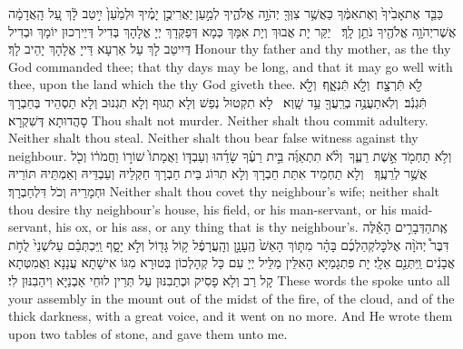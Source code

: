 {כַּבֵּ֤ד אֶת\maqqaf אָבִ֙יךָ֙ וְאֶת\maqqaf אִמֶּ֔ךָ כַּאֲשֶׁ֥ר צִוְּךָ֖ יְהֹוָ֣ה אֱלֹהֶ֑יךָ לְמַ֣עַן \legarmeh  יַאֲרִיכֻ֣ן יָמֶ֗יךָ וּלְמַ֙עַן֙ יִ֣יטַב לָ֔ךְ עַ֚ל הָֽאֲדָמָ֔ה אֲשֶׁר\maqqaf יְהֹוָ֥ה אֱלֹהֶ֖יךָ נֹתֵ֥ן לָֽךְ׃ \setuma }
{יַקַּר יָת אֲבוּךְ וְיָת אִמָּךְ כְּמָא דְּפַקְּדָךְ יְיָ אֱלָהָךְ בְּדִיל דְּיֵירְכוּן יוֹמָךְ וּבְדִיל דְּיִיטַב לָךְ עַל אַרְעָא דַּייָ אֱלָהָךְ יָהֵיב לָךְ׃}
{Honour thy father and thy mother, as the \lord\space thy God commanded thee; that thy days may be long, and that it may go well with thee, upon the land which the \lord\space thy God giveth thee.}{}
{לֹ֥֖א תִּֿרְצָ֖͏ֽח׃ \setuma  וְלֹ֣֖א תִּֿנְאָ֑͏ֽף׃ \setuma  וְלֹ֣֖א תִּֿגְנֹֽ֔ב׃ \setuma  וְלֹֽא\maqqaf תַעֲנֶ֥ה בְרֵֽעֲךָ֖ עֵ֥ד שָֽׁוְא׃ \setuma }
{לָא תִקְטוּל נְפַשׁ וְלָא תְגוּף וְלָא תִגְנוּב וְלָא תַסְהֵיד בְּחַבְרָךְ סָהֲדוּתָא דְּשִׁקְרָא׃}
{Thou shalt not murder. Neither shalt thou commit adultery. Neither shalt thou steal. Neither shalt thou bear false witness against thy neighbour.}{}
{וְלֹ֥א תַחְמֹ֖ד אֵ֣שֶׁת רֵעֶ֑ךָ \setuma  וְלֹ֨א תִתְאַוֶּ֜ה בֵּ֣ית רֵעֶ֗ךָ שָׂדֵ֜הוּ וְעַבְדּ֤וֹ וַאֲמָתוֹ֙ שׁוֹר֣וֹ וַחֲמֹר֔וֹ וְכֹ֖ל אֲשֶׁ֥ר לְרֵעֶֽךָ׃ \setuma }
{וְלָא תַחְמֵיד אִתַּת חַבְרָךְ וְלָא תִרּוֹג בֵּית חַבְרָךְ חַקְלֵיהּ וְעַבְדֵּיהּ וְאַמְתֵּיהּ תּוֹרֵיהּ וּחְמָרֵיהּ וְכֹל דִּלְחַבְרָךְ׃}
{Neither shalt thou covet thy neighbour’s wife; neither shalt thou desire thy neighbour’s house, his field, or his man-servant, or his maid-servant, his ox, or his ass, or any thing that is thy neighbour’s.}{}
{אֶֽת\maqqaf הַדְּבָרִ֣ים הָאֵ֡לֶּה דִּבֶּר֩ יְהֹוָ֨ה אֶל\maqqaf כׇּל\maqqaf קְהַלְכֶ֜ם בָּהָ֗ר מִתּ֤וֹךְ הָאֵשׁ֙ הֶֽעָנָ֣ן וְהָֽעֲרָפֶ֔ל ק֥וֹל גָּד֖וֹל וְלֹ֣א יָסָ֑ף וַֽיִּכְתְּבֵ֗ם עַל\maqqaf שְׁנֵי֙ לֻחֹ֣ת אֲבָנִ֔ים וַֽיִּתְּנֵ֖ם אֵלָֽי׃}
{יָת פִּתְגָמַיָּא הָאִלֵּין מַלֵּיל יְיָ עִם כָּל קְהָלְכוֹן בְּטוּרָא מִגּוֹ אִישָׁתָא עֲנָנָא וַאֲמִטְּתָא קָל רַב וְלָא פָסִיק וּכְתַבִנּוּן עַל תְּרֵין לוּחֵי אַבְנַיָּא וִיהַבִנּוּן לִי׃}
{These words the \lord\space spoke unto all your assembly in the mount out of the midst of the fire, of the cloud, and of the thick darkness, with a great voice, and it went on no more. And He wrote them upon two tables of stone, and gave them unto me.}{}

